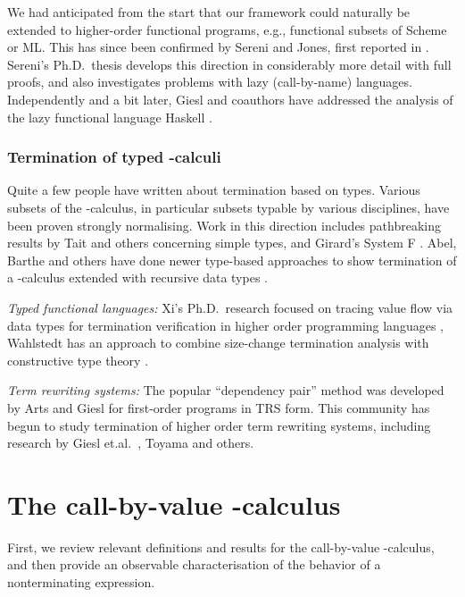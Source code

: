 \documentclass{LMCS}
\theoremstyle{definition}\newtheorem{env}[thm]{Environment}
\begin{document}
We had anticipated from the start that our framework could
naturally be extended to higher-order functional programs, 
e.g., functional subsets of Scheme or ML. This has since been 
confirmed by Sereni and Jones, first reported in  \cite{serenijones}.
Sereni's Ph.D.\ thesis  \cite{sereni} develops this direction in considerably more detail
with full proofs, and also investigates problems with lazy (call-by-name) languages. 
Independently and a bit later, Giesl and coauthors have addressed the analysis of 
the lazy functional language Haskell \cite{haskell}.




\subsubsection*{Termination of typed -calculi} 

Quite a few people have written  about termination based on types. 
Various subsets of the
-calculus, in particular subsets typable by various 
disciplines,  have been proven
strongly normalising. 
Work in this direction includes 
pathbreaking results by Tait  \cite{tait} and others
concerning simple types,
and
Girard's System F  \cite{girard}.
Abel, Barthe and others have done newer type-based approaches to show termination
of a -calculus extended with recursive data types \cite{abel,abelthesis,barthe}. 



{\em Typed functional languages:}
Xi's Ph.D.\ research focused on tracing value flow via data types
for termination verification 
in higher order programming languages  \cite{xi}, 
Wahlstedt has an approach to combine size-change termination 
analysis with constructive type theory
\cite{wahlstedt, wahlstedt1}. 



{\em Term rewriting systems:}
The popular ``dependency pair'' method was developed
 by Arts  and Giesl \cite{giesl-arts} for first-order programs in TRS form.
This community has begun to study termination  of
higher order 
term rewriting systems, including research by 
Giesl et.al.\ \cite{giesl-thiemann,haskell},
Toyama \cite{toyama} and others.

\section{The call-by-value -calculus}

First, we review relevant definitions and results for the
call-by-value -calculus, and then provide an observable
characterisation of the behavior of a nonterminating expression.
\end{document}
